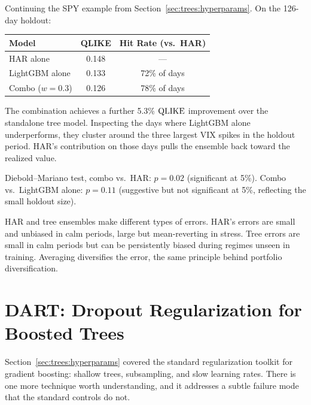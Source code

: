 \begin{workedexample}
Continuing the SPY example from Section~\ref{sec:trees:hyperparams}.  On
the 126-day holdout:

\begin{center}
\renewcommand{\arraystretch}{1.2}
\begin{tabular}{@{}lcc@{}}
\toprule
\textbf{Model} & \textbf{QLIKE} & \textbf{Hit Rate (vs.\ HAR)} \\
\midrule
HAR alone        & 0.148 & ---  \\
LightGBM alone   & 0.133 & 72\% of days \\
Combo ($w=0.3$)  & 0.126 & 78\% of days \\
\bottomrule
\end{tabular}
\end{center}

The combination achieves a further 5.3\% $\operatorname{QLIKE}$ improvement over the
standalone tree model.  Inspecting the days where LightGBM alone
underperforms, they cluster around the three largest VIX spikes in the
holdout period.  HAR's contribution on those days pulls the ensemble back
toward the realized value.

Diebold--Mariano test, combo vs.\ HAR: $p = 0.02$ (significant at 5\%).
Combo vs.\ LightGBM alone: $p = 0.11$ (suggestive but not significant at
5\%, reflecting the small holdout size).
\end{workedexample}

\begin{intuition}
HAR and tree ensembles make different types of errors.  HAR's errors are
small and unbiased in calm periods, large but mean-reverting in stress.
Tree errors are small in calm periods but can be persistently biased during
regimes unseen in training.  Averaging diversifies the error, the same
principle behind portfolio diversification.
\end{intuition}


\section{DART: Dropout Regularization for Boosted Trees}\label{sec:trees:dart}

Section~\ref{sec:trees:hyperparams} covered the standard regularization
toolkit for gradient boosting: shallow trees, subsampling, and slow learning
rates.  There is one more technique worth understanding, and it addresses a
subtle failure mode that the standard controls do not.

